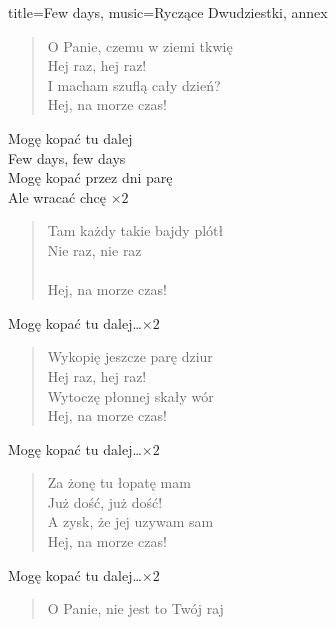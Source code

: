 \newpage
\begin{song}{title={Few days}, music={Ryczące Dwudziestki}, annex}
\begin{multicols}{2}
    \begin{verse}
        O Panie, czemu w ziemi tkwię \\
        Hej raz, hej raz! \\
        I macham szuflą cały dzień? \\
        Hej, na morze czas!
    \end{verse}
    \begin{chorus}
        Mogę kopać tu dalej \\
        Few days, few days \\
        Mogę kopać przez dni parę \\
        Ale wracać chcę $\times 2$
    \end{chorus}
    \begin{verse}
        Tam każdy takie bajdy plótł \\
        Nie raz, nie raz \\
         \\
        Hej, na morze czas!
    \end{verse}
    \begin{chorus}
        Mogę kopać tu dalej\ldots $\times 2$ 
    \end{chorus}
    \vfill\null\columnbreak{}
    \begin{verse}
        Wykopię jeszcze parę dziur \\
        Hej raz, hej raz! \\
        Wytoczę płonnej skały wór \\
        Hej, na morze czas!
    \end{verse}
    \begin{chorus}
        Mogę kopać tu dalej\ldots $\times 2$ 
    \end{chorus}
    \begin{verse}
        Za żonę tu łopatę mam \\
        Już dość, już dość! \\
        A zysk, że jej uzywam sam \\
        Hej, na morze czas!
    \end{verse}
    \begin{chorus}
        Mogę kopać tu dalej\ldots $\times 2$
    \end{chorus}
    \begin{verse}
        O Panie, nie jest to Twój raj \\

\end{verse}
\end{multicols}
\end{song}
